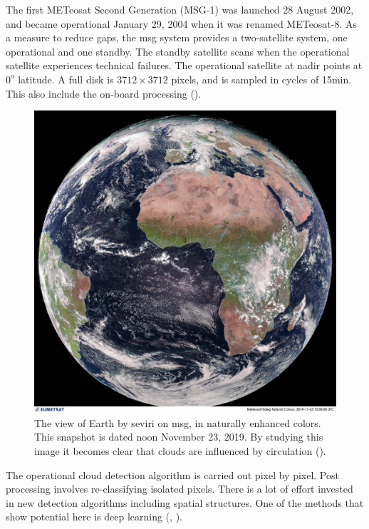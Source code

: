 The first METeosat Second Generation (MSG-1) was launched 28 August 2002, and became operational January 29, 2004 when it was renamed METeosat-8. As a measure to reduce gaps, the \acrshort{msg} system provides a two-satellite system, one operational and one standby. The standby satellite scans when the operational satellite experiences technical failures. 
The operational satellite at nadir points at $0^o$ latitude. A full disk is $3712\times 3712$ pixels, and is sampled in cycles of 15min. This also include the on-board processing (\cite{Schmetz_meteosat_intro}).

\begin{figure}[h]
    \centering
    \includegraphics[scale=0.11]{Chapter2_Theory/images/MET10_RGBNatColourEnhncd_FullResolution_20191123120000.jpg}
    \caption{The view of Earth by \acrshort{seviri} on \acrshort{msg}, in naturally enhanced colors. This snapshot is dated noon November 23, 2019. By studying this image it becomes clear that clouds are influenced by circulation  (\cite{eumetcast_image_gallery}).}
    \label{fig:sat_view}
\end{figure}
The operational cloud detection algorithm is carried out pixel by pixel. Post processing involves re-classifying isolated pixels. There is a lot of effort invested in new detection algorithms including spatial structures. One of the methods that show potential here is deep learning (\cite{Dronner2018FastNetworks}, \cite{jeppesen_deep_cloud_masking}).

